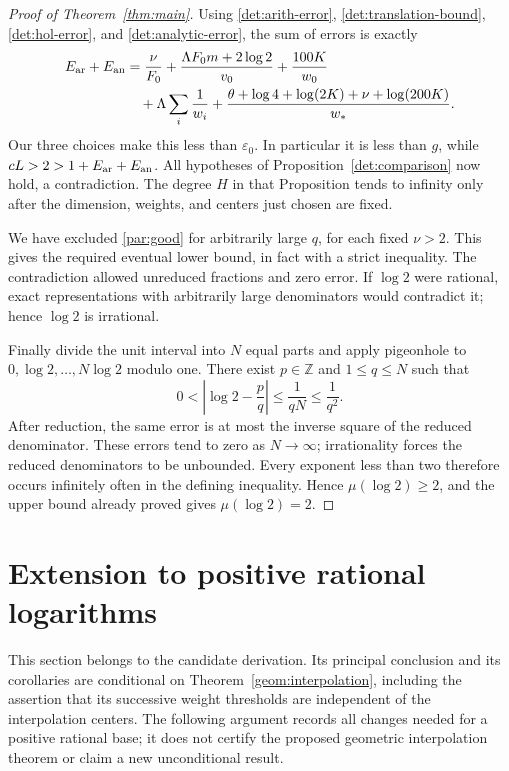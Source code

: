 \documentclass[11pt]{article}
\newcommand{\ZZ}{\mathbb Z}
\theoremstyle{definition}
\theoremstyle{remark}
\numberwithin{equation}{section}
\begin{document}
\begin{proof}[Proof of Theorem~\ref{thm:main}]
Using \eqref{det:arith-error}, \eqref{det:translation-bound},
\eqref{det:hol-error}, and \eqref{det:analytic-error}, the sum of errors
is exactly
\[
\begin{aligned}
E_{\rm ar}+E_{\rm an}
&=\frac{\nu}{F_0}
 +\frac{\Lambda F_0m+2\log2}{v_0}+\frac{100K}{w_0}\\
&\quad +\Lambda\sum_i\frac1{w_i}
 +\frac{\theta+\log4+\log(2K)+\nu+\log(200K)}{w_*}.
\end{aligned}
\]
Our three choices make this less than \(\varepsilon_0\).
In particular it is less than \(g\), while
\(cL>2>1+E_{\rm ar}+E_{\rm an}\).
All hypotheses of Proposition~\ref{det:comparison} now hold,
a contradiction. The degree \(H\) in that Proposition tends to infinity
only after the dimension, weights, and centers just chosen are fixed.

We have excluded \eqref{par:good} for arbitrarily large \(q\), for
each fixed \(\nu>2\). This gives the required eventual lower bound,
in fact with a strict inequality. The contradiction allowed unreduced
fractions and zero error. If \(\log 2\) were rational, exact representations
with arbitrarily large denominators would contradict it; hence
\(\log 2\) is irrational.

Finally divide the unit interval into \(N\) equal parts and apply
pigeonhole to \(0,\log 2,\ldots,N\log 2\) modulo one. There exist \(p\in\ZZ\)
and \(1\le q\le N\) such that
\[
0<\left|\log 2-\frac pq\right|\le\frac1{qN}\le\frac1{q^2}.
\]
After reduction, the same error is at most the inverse square of the
reduced denominator. These errors tend to zero as \(N\to\infty\);
irrationality forces the reduced denominators to be unbounded.
Every exponent less than two therefore occurs infinitely often in
the defining inequality. Hence \(\mu(\log 2)\ge2\), and the upper bound
already proved gives \(\mu(\log 2)=2\).
\end{proof}



\section{Extension to positive rational logarithms}
\label{rat:section}

This section belongs to the candidate derivation.  Its principal
conclusion and its corollaries are conditional on
Theorem~\ref{geom:interpolation}, including the assertion that its
successive weight thresholds are independent of the interpolation
centers.  The following argument records all changes needed for a
positive rational base; it does not certify the proposed geometric
interpolation theorem or claim a new unconditional result.
\end{document}
